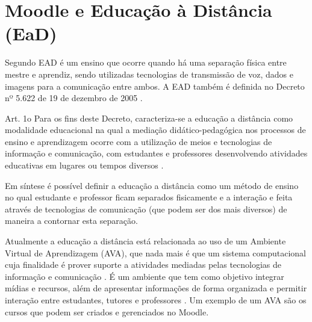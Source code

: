 \documentclass[
	12pt,				%
	openright,			%
	oneside,			%
	a4paper,			%
	english,			%
	french,				%
	spanish,			%
	brazil				%
	]{abntex2}
\begin{document}



\section{Moodle e Educação à Distância (EaD)}\label{cap-ead}

Segundo  EAD é um ensino que ocorre quando há uma separação física entre mestre e aprendiz, sendo utilizadas tecnologias de transmissão de voz, dados e imagens para a comunicação entre ambos. A EAD também é definida no Decreto nº 5.622 de 19 de dezembro de 2005 \cite{BRASIL2005}.
 \begin{citacao}
 	Art. 1o  Para os fins deste Decreto, caracteriza-se a educação a distância como modalidade educacional na qual a mediação didático-pedagógica nos processos de ensino e aprendizagem ocorre com a utilização de meios e tecnologias de informação e comunicação, com estudantes e professores desenvolvendo atividades educativas em lugares ou tempos diversos \cite{BRASIL2005}.
 \end{citacao}
 
Em síntese é possível definir a educação a distância como um método de ensino no qual estudante e professor ficam separados fisicamente e a interação e feita através de tecnologias de comunicação (que podem ser dos mais diversos) de maneira a contornar esta separação.

Atualmente a educação a distância está relacionada ao uso de um Ambiente Virtual de Aprendizagem (AVA), que nada mais é que um sistema computacional cuja finalidade é prover suporte a atividades mediadas pelas tecnologias de informação e comunicação \cite{Almeida2010}. É um ambiente que tem como objetivo integrar mídias e recursos, além de apresentar informações de forma organizada e permitir interação entre estudantes, tutores e professores \cite{Franciscato2008}. Um exemplo de um AVA são os cursos que podem ser criados e gerenciados no Moodle.
   
\end{document}
